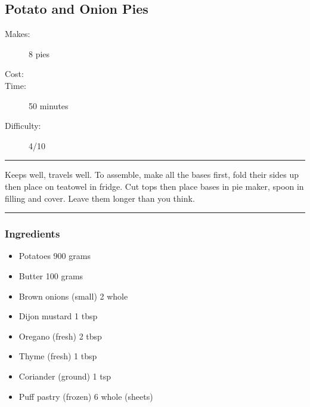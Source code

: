 \documentclass[]{article}
\begin{document}
\subsection*{\center\huge Potato and Onion Pies}
\begin{description}
\item[Makes:] 8 pies
\item[Cost:] \textdollar
\item[Time:] 50 minutes
\item[Difficulty:] 4/10
\end{description}
\vspace{0.2cm}\hrule\vspace{0.5cm}
\begin{adjustwidth}{0.5 cm}{0.5 cm}

Keeps well, travels well. To assemble, make all the bases first, fold their sides up then place on teatowel in fridge. Cut tops then place bases in pie maker, spoon in filling and cover. Leave them longer than you think. \hfill{}\color{black}

\end{adjustwidth}
\vspace{0.5cm}\hrule
\subsubsection*{\Large Ingredients}
\begin{multicols}{2}
\begin{itemize}
 \item Potatoes \hfill 900 grams
 \item Butter \hfill 100 grams
 \item Brown onions (small) \hfill 2 whole
 \item Dijon mustard \hfill 1 tbsp
 \item Oregano (fresh) \hfill 2 tbsp
 \item Thyme (fresh) \hfill 1 tbsp
 \item Coriander (ground) \hfill 1 tsp
 \item Puff pastry (frozen) \hfill 6 whole (sheets)
\end{itemize}
\end{multicols}
\end{document}
